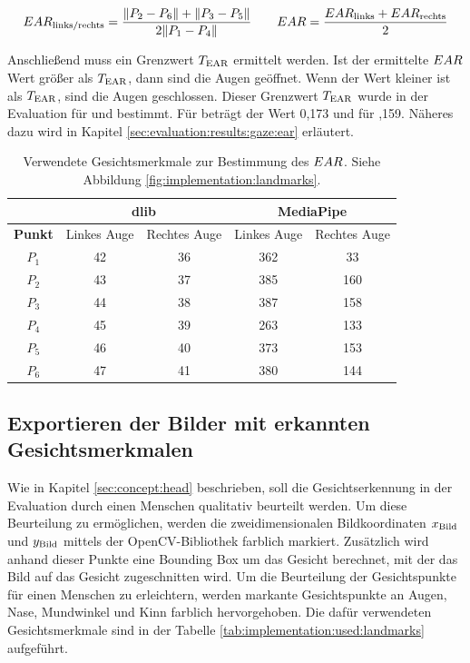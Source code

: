 \[
EAR_{\text{links/rechts}} = \frac{\|P_2 - P_6\| + \|P_3 - P_5\|}{2\|P_1 - P_4\|} \qquad EAR = \frac{EAR_{\text{links}} + EAR_{\text{rechts}}}{2}
\]

Anschließend muss ein Grenzwert $T_{\text{EAR}}$ ermittelt werden. Ist der ermittelte $EAR$ Wert größer als $T_{\text{EAR}}$, dann sind die Augen geöffnet. Wenn der Wert kleiner ist als $T_{\text{EAR}}$, sind die Augen geschlossen. Dieser Grenzwert $T_{\text{EAR}}$ wurde in der Evaluation für \dlib und \mediapipe bestimmt. Für \dlib beträgt der Wert 0,173 und für ,159. Näheres dazu wird in Kapitel \ref{sec:evaluation:results:gaze:ear} erläutert.

\begin{table}[]
    \centering
    \begin{tabular}{c | c c | c c}
        \toprule
        & \multicolumn{2}{c|}{\textbf{dlib}} &\multicolumn{2}{c}{\textbf{MediaPipe}} \\
        \midrule
        \textbf{Punkt} & Linkes Auge & Rechtes Auge & Linkes Auge & Rechtes Auge \\
        \midrule
        $P_1$ & 42 & 36 & 362 & 33 \\
        $P_2$ & 43 & 37 & 385 & 160 \\
        $P_3$ & 44 & 38 & 387 & 158 \\
        $P_4$ & 45 & 39 & 263 & 133 \\
        $P_5$ & 46 & 40 & 373 & 153 \\
        $P_6$ & 47 & 41 & 380 & 144 \\
        \bottomrule
    \end{tabular}
    \caption{Verwendete Gesichtsmerkmale zur Bestimmung des $EAR$. Siehe Abbildung \ref{fig:implementation:landmarks}.}
    \label{tab:implementation:ear}
\end{table}

\subsection{Exportieren der Bilder mit erkannten Gesichtsmerkmalen}\label{sec:implementation:face:export:landmarks}

Wie in Kapitel \ref{sec:concept:head} beschrieben, soll die Gesichtserkennung in der Evaluation durch einen Menschen qualitativ beurteilt werden. Um diese Beurteilung zu ermöglichen, werden die zweidimensionalen Bildkoordinaten $x_{\text{Bild}}$ und $y_{\text{Bild}}$ mittels der OpenCV-Bibliothek farblich markiert. Zusätzlich wird anhand dieser Punkte eine Bounding Box um das Gesicht berechnet, mit der das Bild auf das Gesicht zugeschnitten wird. Um die Beurteilung der Gesichtspunkte für einen Menschen zu erleichtern, werden markante Gesichtspunkte an Augen, Nase, Mundwinkel und Kinn farblich hervorgehoben. Die dafür verwendeten Gesichtsmerkmale sind in der Tabelle \ref{tab:implementation:used:landmarks} aufgeführt.
 
